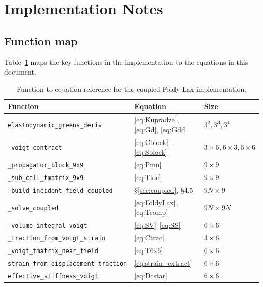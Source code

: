 \documentclass[11pt,a4paper]{article}
\begin{document}
\section{Implementation Notes}
\label{sec:implementation}

\subsection{Function map}

Table~\ref{tab:functions} maps the key functions in the
implementation to the equations in this document.

\begin{table}[ht]
\centering
\caption{Function-to-equation reference for the coupled Foldy-Lax
  implementation.}
\label{tab:functions}
\begin{tabular}{@{}lll@{}}
\toprule
Function & Equation & Size \\
\midrule
\texttt{elastodynamic\_greens\_deriv}
  & \eqref{eq:Kupradze}, \eqref{eq:Gd}, \eqref{eq:Gdd}
  & $3^2, 3^3, 3^4$ \\[2pt]
\texttt{\_voigt\_contract}
  & \eqref{eq:Cblock}--\eqref{eq:Sblock}
  & $3{\times}6, 6{\times}3, 6{\times}6$ \\[2pt]
\texttt{\_propagator\_block\_9x9}
  & \eqref{eq:Pmn}
  & $9{\times}9$ \\[2pt]
\texttt{\_sub\_cell\_tmatrix\_9x9}
  & \eqref{eq:Tloc}
  & $9{\times}9$ \\[2pt]
\texttt{\_build\_incident\_field\_coupled}
  & \S\ref{sec:coupled}, \S4.5
  & $9N{\times}9$ \\[2pt]
\texttt{\_solve\_coupled}
  & \eqref{eq:FoldyLax}, \eqref{eq:Tcomp}
  & $9N{\times}9N$ \\[2pt]
\texttt{\_volume\_integral\_voigt}
  & \eqref{eq:SV}--\eqref{eq:SS}
  & $6{\times}6$ \\[2pt]
\texttt{\_traction\_from\_voigt\_strain}
  & \eqref{eq:Ctrac}
  & $3{\times}6$ \\[2pt]
\texttt{\_voigt\_tmatrix\_near\_field}
  & \eqref{eq:T6x6}
  & $6{\times}6$ \\[2pt]
\texttt{strain\_from\_displacement\_traction}
  & \eqref{eq:strain_extract}
  & $6{\times}6$ \\[2pt]
\texttt{effective\_stiffness\_voigt}
  & \eqref{eq:Dcstar}
  & $6{\times}6$ \\
\bottomrule
\end{tabular}
\end{table}
\end{document}
